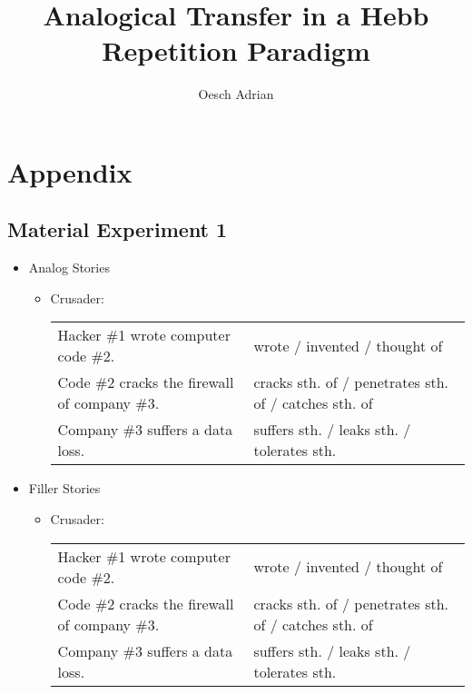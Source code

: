 \documentclass[a4paper,man,natbib,floatsintext,import]{apa6}
\title{Analogical Transfer in a Hebb Repetition Paradigm}
\author{Oesch Adrian}
\affiliation{University of Zurich}
\begin{document}
\section{Appendix}
\subsection{Material Experiment 1}

\small
\begin{itemize}
\item Analog Stories
\begin{itemize}
\item Crusader: \newline
\begin{tabular}{l l}
Hacker \#1 wrote computer code \#2. & wrote / invented / thought of \\
Code \#2 cracks the firewall of company \#3. & cracks sth. of / penetrates sth. of / catches sth. of \\
Company \#3 suffers a data loss. & suffers sth. / leaks sth. / tolerates sth. \\
\end{tabular}
\end{itemize}
\item Filler Stories
\begin{itemize}
\item Crusader: \newline
\begin{tabular}{l l}
Hacker \#1 wrote computer code \#2. & wrote / invented / thought of \\
Code \#2 cracks the firewall of company \#3. & cracks sth. of / penetrates sth. of / catches sth. of \\
Company \#3 suffers a data loss. & suffers sth. / leaks sth. / tolerates sth. \\
\end{tabular}
\end{itemize}
\end{itemize}
\end{document}
